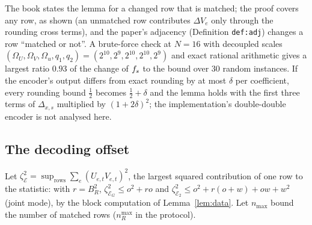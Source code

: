\begin{remark}\label{rem:sensZdecread}
The book states the lemma for a changed row that is matched; the proof covers any row, as shown (an unmatched row contributes $\Delta V_e$ only through the rounding cross terms), and the paper's adjacency (Definition \texttt{def:adj}) changes a row ``matched or not''. A brute-force check at $N=16$ with decoupled scales $(\Omega_U,\Omega_V,\Omega_u,q_1,q_2)=(2^{10},2^9,2^{10},2^{10},2^9)$ and exact rational arithmetic gives a largest ratio $0.93$ of the change of $f_s$ to the bound over $30$ random instances. If the encoder's output differs from exact rounding by at most $\delta$ per coefficient, every rounding bound $\tfrac12$ becomes $\tfrac12+\delta$ and the lemma holds with the first three terms of $\Delta_{x,s}$ multiplied by $(1+2\delta)^2$; the implementation's double-double encoder is not analysed here.
\end{remark}

\subsection{The decoding offset}

Let $\zeta_{\mathcal E}^2=\sup_{\text{rows}}\sum_e(U_{e,t}V_{e,t})^2$, the largest squared contribution of one row to the statistic: with $r=B_R^2$, $\zeta_{\mathcal E_G}^2\le o^2+ro$ and $\zeta_{\mathcal E_2}^2\le o^2+r(o+w)+ow+w^2$ (joint mode), by the block computation of Lemma~\ref{lem:data}. Let $n_{\max}$ bound the number of matched rows ($n_R^{\max}$ in the protocol).

